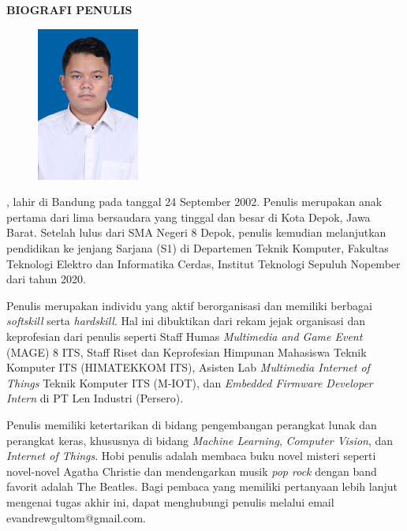 \begin{center}
  \Large
  \textbf{BIOGRAFI PENULIS}
\end{center}


\vspace{2ex}

\begin{figure}
  \centering
  \vspace{-3ex}
  \includegraphics[width=0.3\textwidth]{gambar/evan.jpg}
  \vspace{-4ex}
\end{figure}

\name{}, lahir di Bandung pada tanggal 24 September 2002. Penulis merupakan anak pertama dari lima bersaudara yang tinggal dan besar di Kota Depok, Jawa Barat. Setelah lulus dari SMA Negeri 8 Depok, penulis kemudian melanjutkan pendidikan ke jenjang Sarjana (S1) di Departemen Teknik Komputer, Fakultas Teknologi Elektro dan Informatika Cerdas, Institut Teknologi Sepuluh Nopember dari tahun 2020. 

Penulis merupakan individu yang aktif berorganisasi dan memiliki berbagai \emph{softskill} serta \emph{hardskill}. Hal ini dibuktikan dari rekam jejak organisasi dan keprofesian dari penulis seperti Staff Humas \emph{Multimedia and Game Event} (MAGE) 8 ITS, Staff Riset dan Keprofesian Himpunan Mahasiswa Teknik Komputer ITS (HIMATEKKOM ITS), Asisten Lab \emph{Multimedia Internet of Things} Teknik Komputer ITS (M-IOT), dan \emph{Embedded Firmware Developer Intern} di PT Len Industri (Persero).

Penulis memiliki ketertarikan di bidang pengembangan perangkat lunak dan perangkat keras, khususnya di bidang \emph{Machine Learning}, \emph{Computer Vision}, dan \emph{Internet of Things}. Hobi penulis adalah membaca buku novel misteri seperti novel-novel Agatha Christie dan mendengarkan musik \emph{pop rock} dengan band favorit adalah The Beatles. Bagi pembaca yang memiliki pertanyaan lebih lanjut mengenai tugas akhir ini, dapat menghubungi penulis melalui email evandrewgultom@gmail.com.